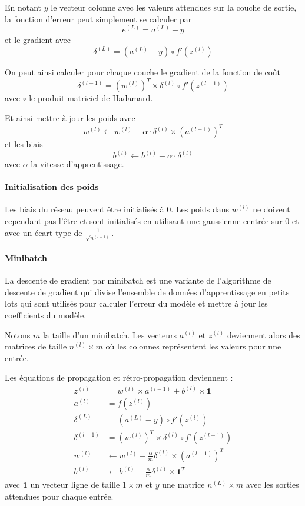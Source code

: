 \documentclass[11pt]{paper}
\begin{document}
En notant $y$ le vecteur colonne avec les valeurs attendues sur la couche de sortie, la fonction d'erreur peut simplement se calculer par $$e^{(L)} = a^{(L)} - y$$ et le gradient avec $$\delta^{(L)} = (a^{(L)} - y)  \circ f'(z^{(l)})$$

On peut ainsi calculer pour chaque couche le gradient de la fonction de coût $$\delta^{(l-1)} = (w^{(l)})^T \times \delta^{(l)} \circ f'(z^{(l-1)})$$ avec $\circ$ le produit matriciel de Hadamard.

Et ainsi mettre à jour les poids avec
$$w^{(l)} \leftarrow w^{(l)} - \alpha \cdot \delta^{(l)} \times (a^{(l-1)})^T$$
 et les biais 
 $$b^{(l)} \leftarrow b^{(l)} - \alpha \cdot \delta^{(l)}$$ avec $\alpha$ la vitesse d'apprentissage.

\paragraph{Initialisation des poids}

Les biais du réseau peuvent être initialisés à 0. Les poids dans $w^{(l)}$ ne doivent cependant pas l'être et sont initialisés en utilisant une gaussienne centrée sur 0 et avec un écart type de $\frac{1}{\sqrt{n^{(l-1)}}}$.


\paragraph{Minibatch}

La descente de gradient par minibatch est une variante de l'algorithme de descente de gradient qui divise l'ensemble de données d'apprentissage en petits lots qui sont utilisés pour calculer l'erreur du modèle et mettre à jour les coefficients du modèle.

Notons $m$ la taille d'un minibatch. Les vecteurs $a^{(l)}$ et $z^{(l)}$ deviennent alors des matrices de taille $n^{(l)} \times m$ où les colonnes représentent les valeurs pour une entrée.

Les équations de propagation et rétro-propagation deviennent :
\begin{align*}
z^{(l)} &= w^{(l)} \times a^{(l-1)} + b^{(l)} \times \mathbf{1}\\
a^{(l)} &= f \left (z^{(l)} \right)\\
\delta^{(L)} &= (a^{(L)} - y)  \circ f'(z^{(l)})\\
\delta^{(l-1)} &= (w^{(l)})^T \times \delta^{(l)} \circ f'(z^{(l-1)})\\
w^{(l)} &\leftarrow w^{(l)} - \frac{\alpha}{m} \delta^{(l)} \times (a^{(l-1)})^T\\
b^{(l)} &\leftarrow b^{(l)} - \frac{\alpha}{m} \delta^{(l)} \times \mathbf{1}^T
\end{align*}
avec $\mathbf{1}$ un vecteur ligne de taille $1 \times m$ et $y$ une matrice $n^{(L)} \times m$ avec les sorties attendues pour chaque entrée.
\end{document}
